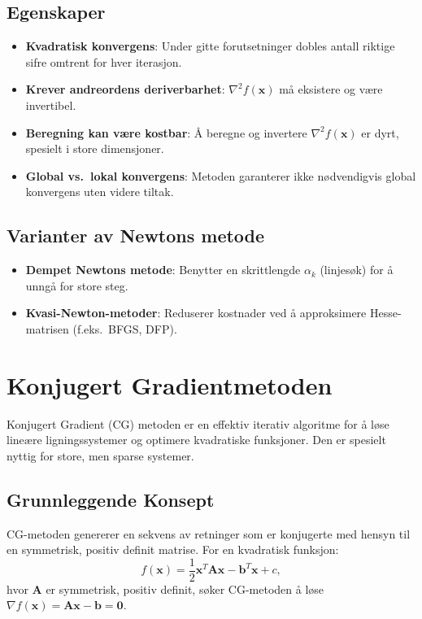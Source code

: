 \subsection{Egenskaper}
\begin{itemize}
	\item \textbf{Kvadratisk konvergens}: Under gitte forutsetninger dobles antall riktige sifre omtrent for hver iterasjon.
	\item \textbf{Krever andreordens deriverbarhet}: \(\nabla^2 f(\symbf{x})\) må eksistere og være invertibel.
	\item \textbf{Beregning kan være kostbar}: Å beregne og invertere \(\nabla^2 f(\symbf{x})\) er dyrt, spesielt i store dimensjoner.
	\item \textbf{Global vs.\ lokal konvergens}: Metoden garanterer ikke nødvendigvis global konvergens uten videre tiltak.
\end{itemize}

\subsection{Varianter av Newtons metode}
\begin{itemize}
	\item \textbf{Dempet Newtons metode}: Benytter en skrittlengde \(\alpha_k\) (linjesøk) for å unngå for store steg.
	\item \textbf{Kvasi-Newton-metoder}: Reduserer kostnader ved å approksimere Hesse-matrisen (f.eks.\ BFGS, DFP).
\end{itemize}

\section{Konjugert Gradientmetoden}
\label{sec:conjugate_gradient}

Konjugert Gradient (CG) metoden er en effektiv iterativ algoritme for å løse lineære ligningssystemer og optimere kvadratiske funksjoner. Den er spesielt nyttig for store, men sparse systemer.

\subsection{Grunnleggende Konsept}
CG-metoden genererer en sekvens av retninger som er konjugerte med hensyn til en symmetrisk, positiv definit matrise. For en kvadratisk funksjon:
\[
	f(\symbf{x}) = \frac{1}{2}\symbf{x}^T\symbf{A}\symbf{x} - \symbf{b}^T\symbf{x} + c,
\]
hvor \(\symbf{A}\) er symmetrisk, positiv definit, søker CG-metoden å løse \(\nabla f(\symbf{x}) = \symbf{A}\symbf{x} - \symbf{b} = \symbf{0}\).

